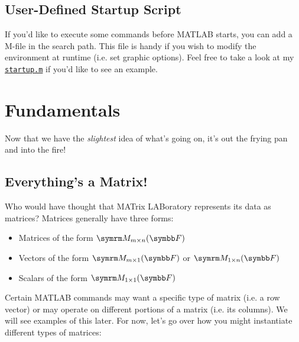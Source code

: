 \documentclass{article}
\begin{document}
\subsection{User-Defined Startup Script}

If you'd like to execute some commands before MATLAB starts, you can add
a  M-file in the search path.  This file is handy if you wish to
modify the environment at runtime (i.e. set graphic options).  Feel free
to take a look at my \href{https://github.com/jacobkoziej/dotfiles/%
blob/master/.config/matlab/startup.m}{\texttt{startup.m}} if you'd like
to see an example.

\section{Fundamentals}

Now that we have the \emph{slightest} idea of what's going on, it's out
the frying pan and into the fire!

\subsection{Everything's a Matrix!}

Who would have thought that MATrix LABoratory represents its data as
matrices?  Matrices generally have three forms:

\begin{itemize}
	\item
		Matrices of the form \(\matrixField{m}{n}{F}\)

	\item
		Vectors of the form \(\matrixField{m}{1}{F}\) or
		\(\matrixField{1}{n}{F}\)

	\item
		Scalars of the form \(\matrixField{1}{1}{F}\)
\end{itemize}

Certain MATLAB commands may want a specific type of matrix (i.e. a row
vector) or may operate on different portions of a matrix (i.e. its
columns).  We will see examples of this later.  For now, let's go over
how you might instantiate different types of matrices:

\inputminted{matlab}{01-matlab-at-a-glance.d/instantiate-matrix.m}
\end{document}
